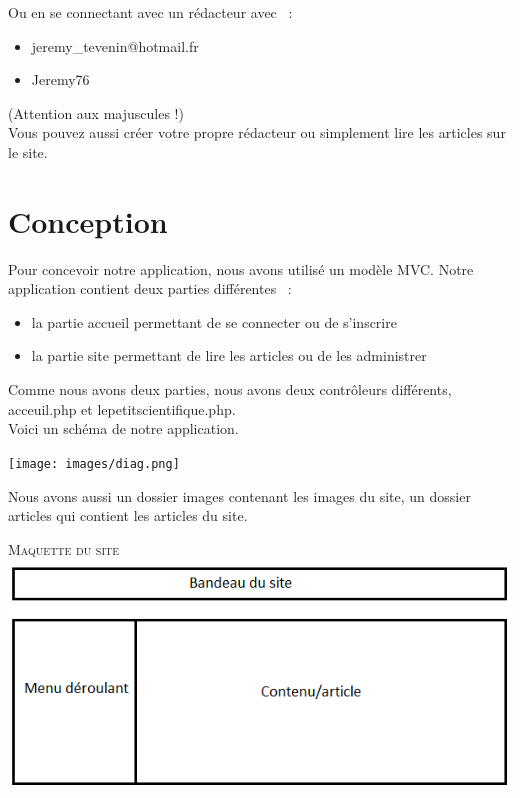 \documentclass[hidelinks, 12pt,a4paper]{article}
\begin{document}
Ou en se connectant avec un rédacteur avec ~:
\begin{itemize}
\item jeremy\_tevenin@hotmail.fr
\item Jeremy76\\
\end{itemize}

(Attention aux majuscules !)\\

Vous pouvez aussi créer votre propre rédacteur ou simplement lire les articles sur le site.

\newpage
\section{Conception}
Pour concevoir notre application, nous avons utilisé un modèle MVC. Notre application contient deux parties différentes ~:
\begin{itemize}
\item la partie accueil permettant de se connecter ou de s'inscrire
\item la partie site permettant de lire les articles ou de les administrer\\
\end{itemize}

Comme nous avons deux parties, nous avons deux contrôleurs différents, acceuil.php et lepetitscientifique.php.\\

Voici un schéma de notre application.\\

\begin{center}
\texttt{[image: images/diag.png]}\\
\end{center}

Nous avons aussi un dossier images contenant les images du site, un dossier articles qui contient les articles du site.\\

\newpage
\begin{center}
\textsc{Maquette du site}\\
\includegraphics[width=16cm]{images/maquette.png}\\
\end{center}
 
\end{document}
